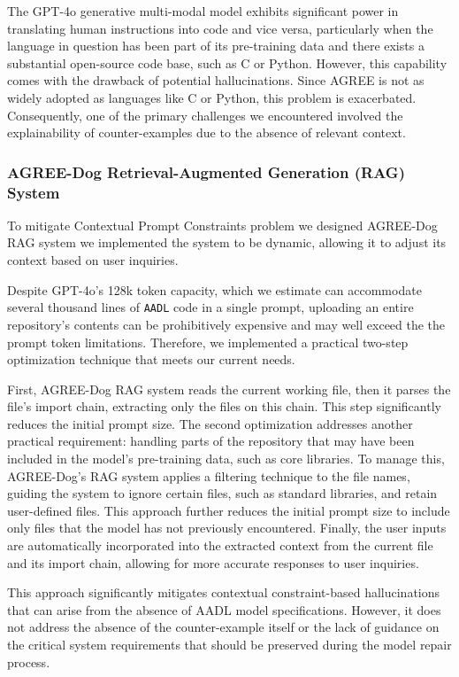 The GPT-4o generative multi-modal model exhibits significant power in translating human instructions into code and vice versa, particularly when the language in question has been part of its pre-training data and there exists a substantial open-source code base, such as C or Python. However, this capability comes with the drawback of potential hallucinations. Since AGREE is not as widely adopted as languages like C or Python, this problem is exacerbated. Consequently, one of the primary challenges we encountered involved the explainability of counter-examples due to the absence of relevant context.
\subsubsection{AGREE-Dog Retrieval-Augmented Generation (RAG) System}

 To mitigate Contextual Prompt Constraints problem we designed AGREE-Dog RAG system we implemented the system to be dynamic, allowing it to adjust its context based on user inquiries. 


Despite GPT-4o's 128k token capacity, which we estimate can accommodate several thousand lines of \texttt{AADL} code in a single prompt, uploading an entire repository's contents can be prohibitively expensive and may well exceed the the prompt token limitations. Therefore, we implemented a practical two-step optimization technique that meets our current needs.

First, AGREE-Dog RAG system reads the current working file, then it parses the file's import chain, extracting only the files on this chain. This step significantly reduces the initial prompt size.%
%
The second optimization addresses another practical requirement: handling parts of the repository that may have been included in the model's pre-training data, such as core libraries. To manage this, AGREE-Dog's RAG system applies a filtering technique to the file names, guiding the system to ignore certain files, such as standard libraries, and retain user-defined files. This approach further reduces the initial prompt size to include only files that the model has not previously encountered. Finally, the user inputs are automatically incorporated into the extracted context from the current file and its import chain, allowing for more accurate responses to user inquiries.

This approach significantly mitigates contextual constraint-based hallucinations that can arise from the absence of AADL model specifications. However, it does not address the absence of the counter-example itself or the lack of guidance on the critical system requirements that should be preserved during the model repair process.
 

